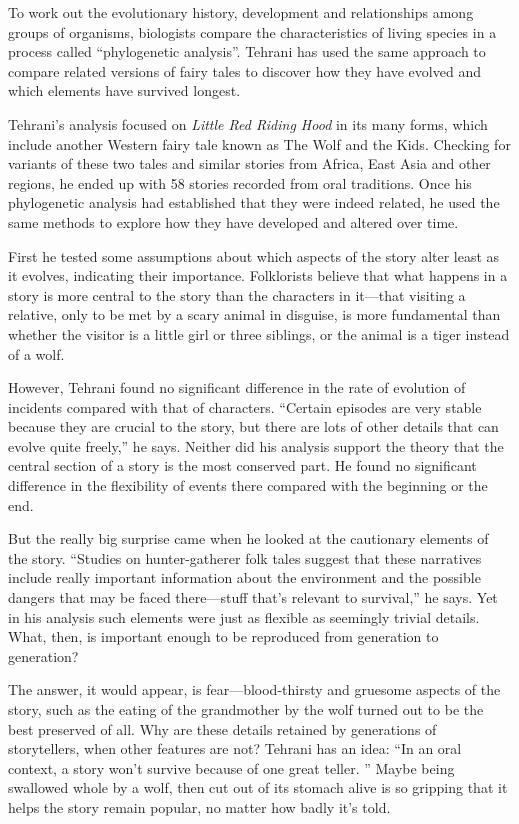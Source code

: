\documentclass{exam-zh}
\begin{document}
To work out the evolutionary history, development and relationships among groups of organisms, biologists compare the characteristics of living species in a process called ``phylogenetic analysis''. Tehrani has used the same approach to compare related versions of fairy tales to discover how they have evolved and which elements have survived longest.

Tehrani's analysis focused on \textit{Little Red Riding Hood} in its many forms, which include another Western fairy tale known as The Wolf and the Kids. Checking for variants of these two tales and similar stories from Africa, East Asia and other regions, he ended up with 58 stories recorded from oral traditions. Once his phylogenetic analysis had established that they were indeed related, he used the same methods to explore how they have developed and altered over time.

First he tested some assumptions about which aspects of the story alter least as it evolves, indicating their importance. Folklorists believe that what happens in a story is more central to the story than the characters in it—that visiting a relative, only to be met by a scary animal in disguise, is more fundamental than whether the visitor is a little girl or three siblings, or the animal is a tiger instead of a wolf.

However, Tehrani found no significant difference in the rate of evolution of incidents compared with that of characters. ``Certain episodes are very stable because they are crucial to the story, but there are lots of other details that can evolve quite freely,'' he says. Neither did his analysis support the theory that the central section of a story is the most conserved part. He found no significant difference in the flexibility of events there compared with the beginning or the end.

But the really big surprise came when he looked at the cautionary elements of the story. ``Studies on hunter-gatherer folk tales suggest that these narratives include really important information about the environment and the possible dangers that may be faced there—stuff that's relevant to survival,'' he says. Yet in his analysis such elements were just as flexible as seemingly trivial details. What, then, is important enough to be reproduced from generation to generation?

The answer, it would appear, is fear—blood-thirsty and gruesome aspects of the story, such as the eating of the grandmother by the wolf turned out to be the best preserved of all. Why are these details retained by generations of storytellers, when other features are not? Tehrani has an idea: ``In an oral context, a story won't survive because of one great teller. \fillin[A]'' Maybe being swallowed whole by a wolf, then cut out of its stomach alive is so gripping that it helps the story remain popular, no matter how badly it's told.
\end{document}

